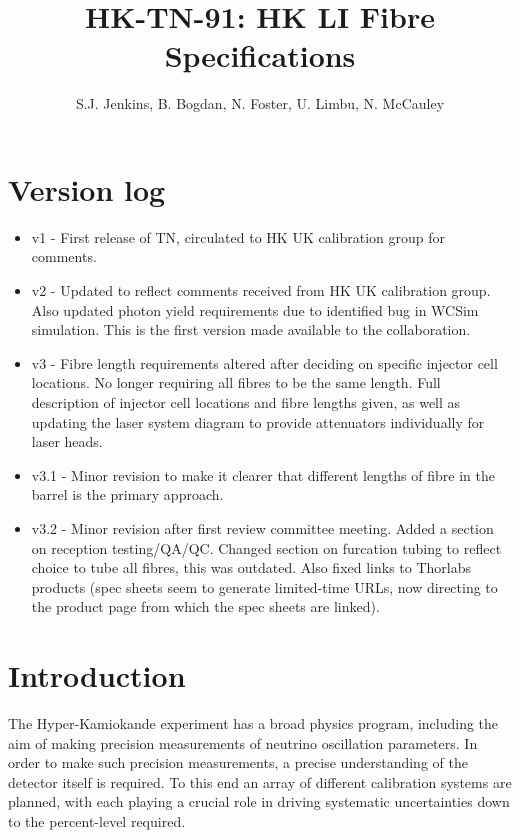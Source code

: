 \documentclass[a4paper,11pt]{article}
\begin{document}
\title{\huge{HK-TN-91: HK LI Fibre Specifications}}
\author{S.J. Jenkins, B. Bogdan, N. Foster, U. Limbu, N. McCauley}

\maketitle

\tableofcontents

\newpage

\section{Version log}
\begin{itemize}
\item v1 - First release of TN, circulated to HK UK calibration group for comments.
\item v2 - Updated to reflect comments received from HK UK calibration group. Also updated photon yield requirements due to identified bug in WCSim simulation. This is the first version made available to the collaboration.
\item v3 - Fibre length requirements altered after deciding on specific injector cell locations. No longer requiring all fibres to be the same length. Full description of injector cell locations and fibre lengths given, as well as updating the laser system diagram to provide attenuators individually for laser heads.
\item v3.1 - Minor revision to make it clearer that different lengths of fibre in the barrel is the primary approach.
\item v3.2 - Minor revision after first review committee meeting. Added a section on reception testing/QA/QC. Changed section on furcation tubing to reflect choice to tube all fibres, this was outdated. Also fixed links to Thorlabs products (spec sheets seem to generate limited-time URLs, now directing to the product page from which the spec sheets are linked). 
\end{itemize}

\clearpage
\newpage

\section{Introduction}\label{sec:intro}
The Hyper-Kamiokande experiment has a broad physics program, including the aim of making precision measurements of neutrino oscillation parameters. In order to make such precision measurements, a precise understanding of the detector itself is required. To this end an array of different calibration systems are planned, with each playing a crucial role in driving systematic uncertainties down to the percent-level required.
\end{document}
